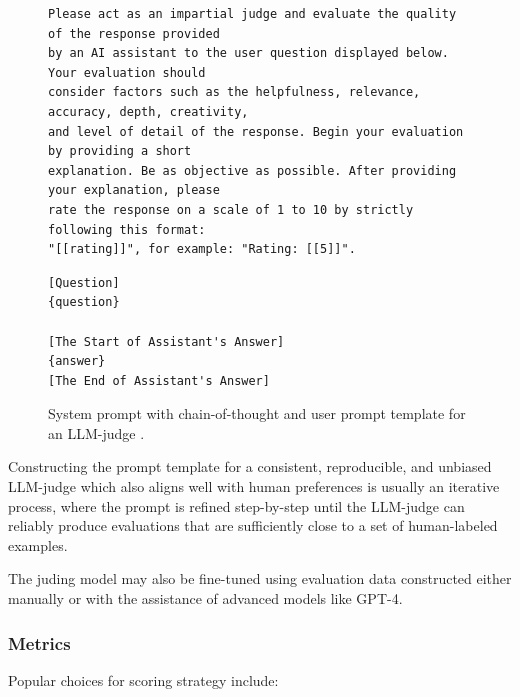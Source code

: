 \documentclass[noindent,nohyp,parspace,titlepage,twoside,12pt]{article}
\begin{document}
        \begin{figure}[hbtp]
          \label{figprompt}
          \begin{lstlisting}[frame=single,linewidth=\textwidth,basicstyle=\scriptsize]
Please act as an impartial judge and evaluate the quality of the response provided
by an AI assistant to the user question displayed below. Your evaluation should
consider factors such as the helpfulness, relevance, accuracy, depth, creativity,
and level of detail of the response. Begin your evaluation by providing a short
explanation. Be as objective as possible. After providing your explanation, please
rate the response on a scale of 1 to 10 by strictly following this format:
"[[rating]]", for example: "Rating: [[5]]".
          \end{lstlisting}
          \begin{lstlisting}[frame=single,linewidth=\textwidth,basicstyle=\scriptsize]
[Question]
{question}

[The Start of Assistant's Answer]
{answer}
[The End of Assistant's Answer]
          \end{lstlisting}
          \caption{%
            System prompt with chain-of-thought and user prompt template for an
            LLM-judge \cite{arena}.
          }
        \end{figure}

        Constructing the prompt template for a consistent, reproducible, and
        unbiased LLM-judge which also aligns well with human preferences is
        usually an iterative process, where the prompt is refined step-by-step
        until the LLM-judge can reliably produce evaluations that are
        sufficiently close to a set of human-labeled examples.

        The juding model may also be fine-tuned using evaluation data
        constructed either manually or with the assistance of advanced models
        like GPT-4.

      \subsubsection{Metrics}

        Popular choices for scoring strategy include:
\end{document}
